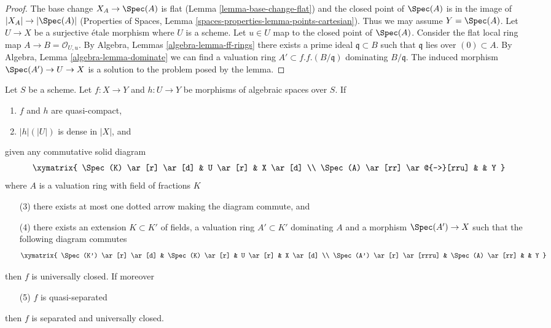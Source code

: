\begin{proof}
The base change $X_A \to \Spec(A)$ is flat
(Lemma \ref{lemma-base-change-flat}) and the closed point of
$\Spec(A)$ is in the image of $|X_A| \to |\Spec(A)|$
(Properties of Spaces, Lemma \ref{spaces-properties-lemma-points-cartesian}).
Thus we may assume $Y = \Spec(A)$. Let $U \to X$ be a surjective
\'etale morphism where $U$ is a scheme. Let $u \in U$ map to
the closed point of $\Spec(A)$. Consider the flat local ring map
$A \to B = \mathcal{O}_{U, u}$. By
Algebra, Lemmas \ref{algebra-lemma-ff-rings}
there exists a prime ideal $\mathfrak q \subset B$ such that
$\mathfrak q$ lies over $(0) \subset A$. By
Algebra, Lemma \ref{algebra-lemma-dominate}
we can find a valuation ring $A' \subset f.f.(B/\mathfrak q)$
dominating $B/\mathfrak q$. The induced morphism
$\Spec(A') \to U \to X$ is a solution to the problem
posed by the lemma.
\end{proof}

\begin{lemma}
\label{lemma-refined-valuative-criterion-universally-closed}
Let $S$ be a scheme. Let $f : X \to Y$ and $h : U \to Y$ be morphisms of
algebraic spaces over $S$. If
\begin{enumerate}
\item $f$ and $h$ are quasi-compact,
\item $|h|(|U|)$ is dense in $|X|$, and
\end{enumerate}
given any commutative solid diagram
$$
\xymatrix{
\Spec(K) \ar[r] \ar[d] & U \ar[r] & X \ar[d] \\
\Spec(A) \ar[rr] \ar@{-->}[rru] & & Y
}
$$
where $A$ is a valuation ring with field of fractions $K$
\begin{enumerate}
\item[(3)] there exists at most one dotted arrow making the diagram
commute, and
\item[(4)] there exists an extension $K \subset K'$ of fields, a
valuation ring $A' \subset K'$ dominating $A$ and a morphism
$\Spec(A') \to X$ such that the following diagram commutes
$$
\xymatrix{
\Spec(K') \ar[r] \ar[d] & \Spec(K) \ar[r] & U \ar[r] & X \ar[d] \\
\Spec(A') \ar[r] \ar[rrru] & \Spec(A) \ar[rr] & & Y
}
$$
\end{enumerate}
then $f$ is universally closed. If moreover
\begin{enumerate}
\item[(5)] $f$ is quasi-separated
\end{enumerate}
then $f$ is separated and universally closed.
\end{lemma}

